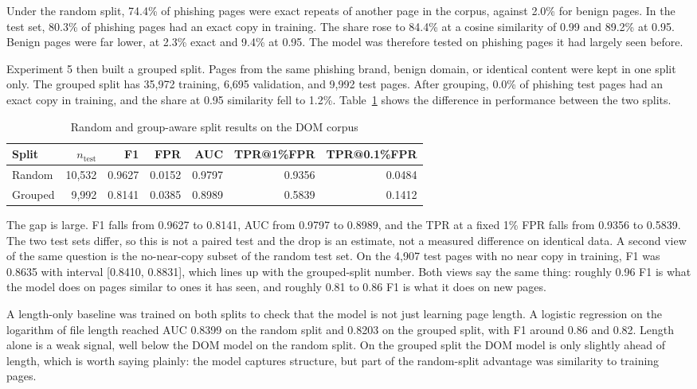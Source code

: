 \documentclass{FastFyp}
\begin{document}
Under the random split, 74.4\% of phishing pages were exact repeats of another page in the corpus, against 2.0\% for benign pages. In the test set, 80.3\% of phishing pages had an exact copy in training. The share rose to 84.4\% at a cosine similarity of 0.99 and 89.2\% at 0.95. Benign pages were far lower, at 2.3\% exact and 9.4\% at 0.95. The model was therefore tested on phishing pages it had largely seen before.

Experiment 5 then built a grouped split. Pages from the same phishing brand, benign domain, or identical content were kept in one split only. The grouped split has 35{,}972 training, 6{,}695 validation, and 9{,}992 test pages. After grouping, 0.0\% of phishing test pages had an exact copy in training, and the share at 0.95 similarity fell to 1.2\%. Table~\ref{tab:leakage} shows the difference in performance between the two splits.

\begin{table}[htbp]
\centering
\caption{Random and group-aware split results on the DOM corpus}
\label{tab:leakage}
\begin{tabular}{lrrrrrr}
\hline
Split & $n_{\text{test}}$ & F1 & FPR & AUC & TPR@1\%FPR & TPR@0.1\%FPR \\
\hline
Random & 10{,}532 & 0.9627 & 0.0152 & 0.9797 & 0.9356 & 0.0484 \\
Grouped & 9{,}992 & 0.8141 & 0.0385 & 0.8989 & 0.5839 & 0.1412 \\
\hline
\end{tabular}
\end{table}

The gap is large. F1 falls from 0.9627 to 0.8141, AUC from 0.9797 to 0.8989, and the TPR at a fixed 1\% FPR falls from 0.9356 to 0.5839. The two test sets differ, so this is not a paired test and the drop is an estimate, not a measured difference on identical data. A second view of the same question is the no-near-copy subset of the random test set. On the 4{,}907 test pages with no near copy in training, F1 was 0.8635 with interval [0.8410, 0.8831], which lines up with the grouped-split number. Both views say the same thing: roughly 0.96 F1 is what the model does on pages similar to ones it has seen, and roughly 0.81 to 0.86 F1 is what it does on new pages.

A length-only baseline was trained on both splits to check that the model is not just learning page length. A logistic regression on the logarithm of file length reached AUC 0.8399 on the random split and 0.8203 on the grouped split, with F1 around 0.86 and 0.82. Length alone is a weak signal, well below the DOM model on the random split. On the grouped split the DOM model is only slightly ahead of length, which is worth saying plainly: the model captures structure, but part of the random-split advantage was similarity to training pages.
\end{document}
